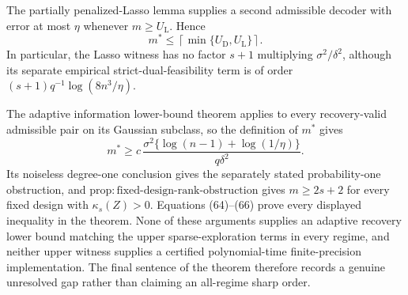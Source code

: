 The partially penalized-Lasso lemma supplies a second admissible decoder with error at most \(\eta\) whenever \(m\ge U_{\mathrm L}\).  Hence
\[
 m^*\le\left\lceil\min\{U_{\mathrm D},U_{\mathrm L}\}\right\rceil.
 \tag{65}
\]
In particular, the Lasso witness has no factor \(s+1\) multiplying \(\sigma^2/\delta^2\), although its separate empirical strict-dual-feasibility term is of order \((s+1)q^{-1}\log(8n^3/\eta)\).

The adaptive information lower-bound theorem applies to every recovery-valid admissible pair on its Gaussian subclass, so the definition of \(m^*\) gives
\[
 m^*\ge c\,\frac{\sigma^2\{\log(n-1)+\log(1/\eta)\}}{q\delta^2}.
 \tag{66}
\]
Its noiseless degree-one conclusion gives the separately stated probability-one obstruction, and \(\mathrm{prop{:}fixed\text{-}design\text{-}rank\text{-}obstruction}\) gives \(m\ge2s+2\) for every fixed design with \(\kappa_s(Z)>0\).  Equations (64)--(66) prove every displayed inequality in the theorem.  None of these arguments supplies an adaptive recovery lower bound matching the upper sparse-exploration terms in every regime, and neither upper witness supplies a certified polynomial-time finite-precision implementation.  The final sentence of the theorem therefore records a genuine unresolved gap rather than claiming an all-regime sharp order.